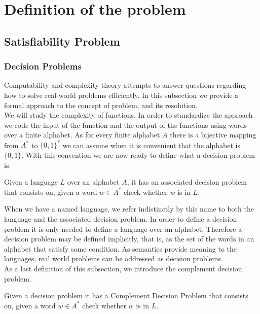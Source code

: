 \chapter{Definition of the problem}
\section{Satisfiability Problem}
\subsection{Decision Problems}
Computability and complexity theory attempts to answer questions regarding how to solve real-world problems efficiently. In this subsection we provide a formal approach to the concept of problem, and its resolution.\\

We will study the complexity of functions. In order to standardize the approach we code the input of the function and the output of the functions using words over a finite alphabet. As for every finite alphabet $A$ there is a bijective mapping from $A^*$ to $\{0,1\}^*$ we can assume when it is convenient that the alphabet is $\{0,1\}$. With this convention we are now ready to define what a decision problem is.

\begin{definition}
  Given a language $L$ over an alphabet $A$, it has an associated decision problem that consists on, given a word $w\in A^*$ check whether $w$ is in $L$. 	
\end{definition}


When we have a named language, we refer indistinctly by this name to both the language and the associated decision problem. In order to define a decision problem it is only needed to define a language over an alphabet. Therefore a decision problem may be defined implicitly, that is, as the set of the words in an alphabet that satisfy some condition. As semantics provide meaning to the languages, real world problems can be addressed as decision problems.\\

As a last definition of this subsection, we introduce the complement decision problem.
\begin{definition}
  Given a decision problem it has a Complement Decision Problem that consists on, given a word $w\in A^*$ check whether $w$ is in $L$. 	
\end{definition}


